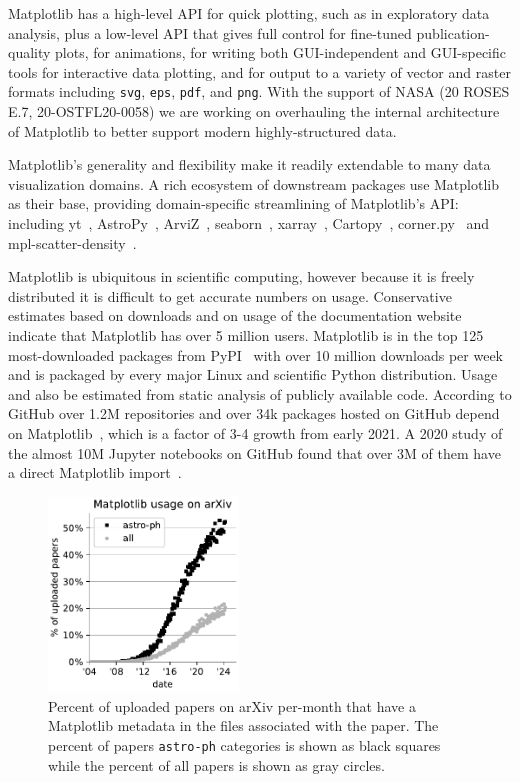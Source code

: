 \documentclass[12pt]{article}
\numberwithin{page}{section}
\begin{document}
Matplotlib has a high-level API for quick plotting, such as in exploratory data
analysis, plus a low-level API that gives full control for fine-tuned
publication-quality plots, for animations, for writing both GUI-independent and
GUI-specific tools for interactive data plotting, and for output to a variety
of vector and raster formats including \texttt{svg}, \texttt{eps},
\texttt{pdf}, and \texttt{png}.  With the support of NASA (20 ROSES E.7, 20-OSTFL20-0058)
we are working on overhauling the internal architecture of Matplotlib to better
support modern highly-structured data.

Matplotlib's generality and flexibility make it readily extendable to
many data visualization domains.  A rich ecosystem of downstream packages use
Matplotlib as their base, providing domain-specific streamlining of
Matplotlib's API: including
yt~\cite{2011ApJS..192....9T}, AstroPy~\cite{astropy:2013,
  astropy:2018}, ArviZ~\cite{arviz_2019},
seaborn~\cite{waskom2020seaborn}, xarray~\cite{hoyer2017xarray},
Cartopy~\cite{Cartopy}, corner.py~\cite{corner} and
mpl-scatter-density~\cite{mpl-scatter-density}.

Matplotlib is ubiquitous in scientific computing, however because it is freely
distributed it is difficult to get accurate numbers on usage.  Conservative
estimates based on downloads and on usage of the documentation website indicate
that Matplotlib has over 5 million users.  Matplotlib is in the top 125
most-downloaded packages from PyPI~\cite{pypi_stats} with over 10 million
downloads per week and is packaged by every major Linux and scientific Python
distribution.  Usage and also be estimated from static analysis of publicly
available code.  According to GitHub over 1.2M repositories and over 34k
packages hosted on GitHub depend on Matplotlib~\cite{gh_deps:2024},  which is a
factor of 3-4 growth from early 2021. A 2020 study of the almost 10M Jupyter
notebooks on GitHub found that over 3M of them have a direct Matplotlib
import~\cite{datalore:2020}.


\begin{figure}
  \includegraphics[width=0.45\textwidth]{arXiv_usage}
  \caption{\small Percent of uploaded papers on arXiv per-month that have a Matplotlib
    metadata in the files associated with the paper.  The percent of papers
    \texttt{astro-ph} categories is shown as black squares while
    the percent of all papers is shown as gray circles.}
  \label{fig:arxiv}
\end{figure}
\end{document}
